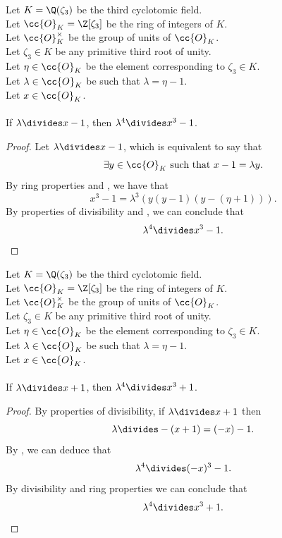 \begin{lemma}
    \label{lmm:lambda_pow_four_dvd_cube_sub_one_of_dvd_sub_one}
    \leanok
    Let $K = \Q(\zeta_3)$ be the third cyclotomic field. \\
    Let $\cc{O}_K = \Z[\zeta_3]$ be the ring of integers of $K$. \\
    Let $\cc{O}^\times_K$ be the group of units of $\cc{O}_K$. \\
    Let $\zeta_3 \in K$ be any primitive third root of unity. \\
    Let $\eta \in \cc{O}_K$ be the element corresponding to $\zeta_3 \in K$. \\
    Let $\lambda \in \cc{O}_K$ be such that $\lambda = \eta -1$. \\
    Let $x \in \cc{O}_K$. \\\\
    If $\lambda\divides x - 1$, then $\lambda^ 4 \divides x^3 - 1$.
\end{lemma}
\begin{proof}
    \leanok
    Let $\lambda \divides x - 1$, which is equivalent to say that
    $$\exists y\in \cc{O}_K \text{ such that } x - 1 = \lambda y.$$
    By ring properties and , we have that
    $$x^3 - 1 = \lambda^3 (y (y - 1) (y - (\eta + 1))).$$
    By properties of divisibility and ,
    we can conclude that $$\lambda^ 4 \divides x^3 - 1.$$
\end{proof}

\begin{lemma}
    \label{lmm:lambda_pow_four_dvd_cube_add_one_of_dvd_add_one}
    \leanok
    Let $K = \Q(\zeta_3)$ be the third cyclotomic field. \\
    Let $\cc{O}_K = \Z[\zeta_3]$ be the ring of integers of $K$. \\
    Let $\cc{O}^\times_K$ be the group of units of $\cc{O}_K$. \\
    Let $\zeta_3 \in K$ be any primitive third root of unity. \\
    Let $\eta \in \cc{O}_K$ be the element corresponding to $\zeta_3 \in K$. \\
    Let $\lambda \in \cc{O}_K$ be such that $\lambda = \eta -1$. \\
    Let $x \in \cc{O}_K$. \\\\
    If $\lambda \divides x + 1$, then $\lambda^4 \divides x ^ 3 + 1$.
\end{lemma}
\begin{proof}
    \leanok
    By properties of divisibility, if $\lambda \divides x + 1$
    then $$\lambda \divides - (x + 1) = (- x) - 1.$$
    By , we can deduce that
    $$\lambda^ 4 \divides (-x)^3 - 1.$$
    By divisibility and ring properties we can conclude that $$\lambda^ 4 \divides x^3 + 1.$$
\end{proof}

